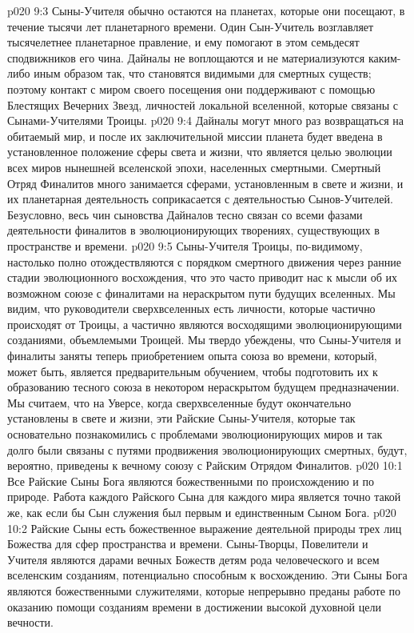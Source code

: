 \vs p020 9:3 Сыны\hyp{}Учителя обычно остаются на планетах, которые они посещают, в течение тысячи лет планетарного времени. Один Сын\hyp{}Учитель возглавляет тысячелетнее планетарное правление, и ему помогают в этом семьдесят сподвижников его чина. Дайналы не воплощаются и не материализуются каким\hyp{}либо иным образом так, что становятся видимыми для смертных существ; поэтому контакт с миром своего посещения они поддерживают с помощью Блестящих Вечерних Звезд, личностей локальной вселенной, которые связаны с Сынами\hyp{}Учителями Троицы.
\vs p020 9:4 Дайналы могут много раз возвращаться на обитаемый мир, и после их заключительной миссии планета будет введена в установленное положение сферы света и жизни, что является целью эволюции всех миров нынешней вселенской эпохи, населенных смертными. Смертный Отряд Финалитов много занимается сферами, установленным в свете и жизни, и их планетарная деятельность соприкасается с деятельностью Сынов\hyp{}Учителей. Безусловно, весь чин сыновства Дайналов тесно связан со всеми фазами деятельности финалитов в эволюционирующих творениях, существующих в пространстве и времени.
\vs p020 9:5 \pc Сыны\hyp{}Учителя Троицы, по\hyp{}видимому, настолько полно отождествляются с порядком смертного движения через ранние стадии эволюционного восхождения, что это часто приводит нас к мысли об их возможном союзе с финалитами на нераскрытом пути будущих вселенных. Мы видим, что руководители сверхвселенных есть личности, которые частично происходят от Троицы, а частично являются восходящими эволюционирующими созданиями, объемлемыми Троицей. Мы твердо убеждены, что Сыны\hyp{}Учителя и финалиты заняты теперь приобретением опыта союза во времени, который, может быть, является предварительным обучением, чтобы подготовить их к образованию тесного союза в некотором нераскрытом будущем предназначении. Мы считаем, что на Уверсе, когда сверхвселенные будут окончательно установлены в свете и жизни, эти Райские Сыны\hyp{}Учителя, которые так основательно познакомились с проблемами эволюционирующих миров и так долго были связаны с путями продвижения эволюционирующих смертных, будут, вероятно, приведены к вечному союзу с Райским Отрядом Финалитов.
\vs p020 10:1 Все Райские Сыны Бога являются божественными по происхождению и по природе. Работа каждого Райского Сына для каждого мира является точно такой же, как если бы Сын служения был первым и единственным Сыном Бога.
\vs p020 10:2 Райские Сыны есть божественное выражение деятельной природы трех лиц Божества для сфер пространства и времени. Сыны\hyp{}Творцы, Повелители и Учителя являются дарами вечных Божеств детям рода человеческого и всем вселенским созданиям, потенциально способным к восхождению. Эти Сыны Бога являются божественными служителями, которые непрерывно преданы работе по оказанию помощи созданиям времени в достижении высокой духовной цели вечности.
